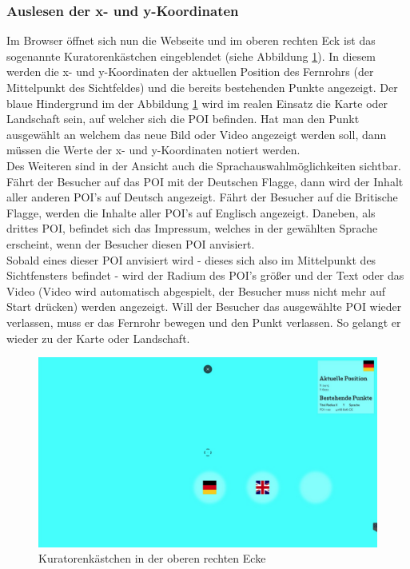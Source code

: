 \subsubsection{Auslesen der x- und y-Koordinaten}

Im Browser öffnet sich nun die Webseite und im oberen rechten Eck ist das sogenannte Kuratorenkästchen eingeblendet (siehe Abbildung \ref{img:kuratorenkaestchen}). In diesem werden die x- und y-Koordinaten der aktuellen Position des Fernrohrs (der Mittelpunkt des Sichtfeldes) und die bereits bestehenden Punkte angezeigt. Der blaue Hindergrund im der Abbildung \ref{img:kuratorenkaestchen} wird im realen Einsatz die Karte oder Landschaft sein, auf welcher sich die POI befinden.
Hat man den Punkt ausgewählt an welchem das neue Bild oder Video angezeigt werden soll, dann müssen die Werte der x- und y-Koordinaten notiert werden.\\

Des Weiteren sind in der Ansicht auch die Sprachauswahlmöglichkeiten sichtbar. Fährt der Besucher auf das POI mit der Deutschen Flagge, dann wird der Inhalt aller anderen POI's auf Deutsch angezeigt. Fährt der Besucher auf die Britische Flagge, werden die Inhalte aller POI's auf Englisch angezeigt. Daneben, als drittes POI, befindet sich das Impressum, welches in der gewählten Sprache erscheint, wenn der Besucher diesen POI anvisiert.\\

Sobald eines dieser POI anvisiert wird - dieses sich also im Mittelpunkt des Sichtfensters befindet - wird der Radium des POI's größer und der Text oder das Video (Video wird automatisch abgespielt, der Besucher muss nicht mehr auf Start drücken) werden angezeigt. 
Will der Besucher das ausgewählte POI wieder verlassen, muss er das Fernrohr bewegen und den Punkt verlassen. So gelangt er wieder zu der Karte oder Landschaft.

\begin{figure}[ht!]
\centering
\includegraphics[width=12cm]{Figures/paula/fernrohr/kuratorenkaestchen.png}
\caption{Kuratorenkästchen in der oberen rechten Ecke}
\label{img:kuratorenkaestchen}
\end{figure}

